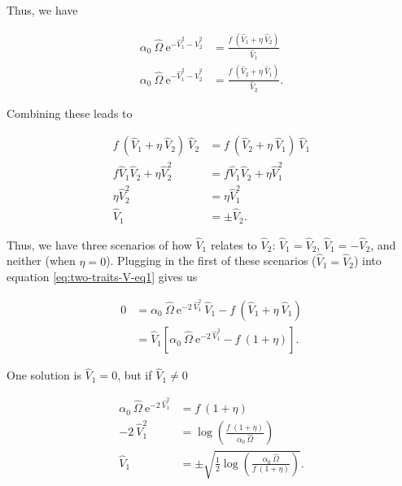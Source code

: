 Thus, we have

\begin{equation*}
\begin{split}
    \alpha_0 ~ \hat{\Omega} ~ \textrm{e}^{-\hat{V}_{1}^2 - \hat{V}_{2}^2} &=
        \frac{ f ~ ( \hat{V}_{1} + \eta ~ \hat{V}_{2} ) }{ \hat{V}_{1} } \\
    \alpha_0 ~ \hat{\Omega} ~ \textrm{e}^{-\hat{V}_{1}^2 - \hat{V}_{2}^2} &=
        \frac{ f ~ ( \hat{V}_{2} + \eta ~ \hat{V}_{1} ) }{ \hat{V}_{2} }
    \textrm{.}
\end{split}
\end{equation*}


Combining these leads to

\begin{equation*}
\begin{split}
    f ~ ( \hat{V}_{1} + \eta ~ \hat{V}_{2} ) ~ \hat{V}_{2} &=
        f ~ ( \hat{V}_{2} + \eta ~ \hat{V}_{1} ) ~ \hat{V}_{1} \\
    f \hat{V}_{1} \hat{V}_{2} + \eta \hat{V}_{2}^2 &=
        f \hat{V}_{1} \hat{V}_{2} + \eta \hat{V}_{1}^2 \\
    \eta \hat{V}_{2}^2 &= \eta \hat{V}_{1}^2 \\
    \hat{V}_{1} &= \pm \hat{V}_{2}
    \textrm{.}
\end{split}
\end{equation*}

Thus, we have three scenarios of how $\hat{V}_{1}$ relates to $\hat{V}_{2}$:
$\hat{V}_{1} = \hat{V}_{2}$, $\hat{V}_{1} = - \hat{V}_{2}$, and
neither (when $\eta = 0$).
Plugging in the first of these scenarios
($\hat{V}_{1} = \hat{V}_{2}$) into equation \ref{eq:two-traits-V-eq1}
gives us

\begin{equation*}
\begin{split}
    0 &= \alpha_0 ~ \hat{\Omega} ~ \textrm{e}^{-2 ~ \hat{V}_{1}^2 } ~ \hat{V}_{1}
        - f ~ ( \hat{V}_{1} + \eta ~ \hat{V}_{1} ) \\
    &= \hat{V}_{1} \left[ \alpha_0 ~ \hat{\Omega} ~ \textrm{e}^{-2 ~ \hat{V}_{1}^2 }
        - f ~ ( 1 + \eta ) \right]
    \textrm{.}
\end{split}
\end{equation*}

One solution is $\hat{V}_{1} = 0$, but if $\hat{V}_{1} \ne 0$


\begin{equation}
\begin{split}
    \alpha_0 ~ \hat{\Omega} ~ \textrm{e}^{-2 ~ \hat{V}_{1}^2 } &=
        f ~ ( 1 + \eta ) \\
    -2 ~ \hat{V}_{1}^2 &=
        \log \left( \frac{ f ~ ( 1 + \eta ) }{ \alpha_0 ~ \hat{\Omega} } \right) \\
    \hat{V}_{1} &= \pm \sqrt{\frac{1}{2}
        \log \left( \frac{ \alpha_0 ~ \hat{\Omega} }{ f ~ ( 1 + \eta ) } \right) }
    \textrm{.}
\end{split}
\label{eq:two-traits-V-eq5}
\end{equation}


